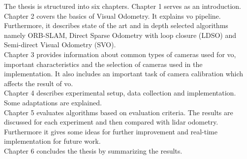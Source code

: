 The thesis is structured into six chapters. Chapter 1 serves as an introduction.\\
\newline 
Chapter 2 covers the basics of Visual Odometry. It explains \acrshort{vo} pipeline. Furthermore, it describes state of the art and in depth selected algorithms namely ORB-SLAM, Direct Sparse Odometry with loop closure (LDSO) and Semi-direct Visual Odometry (SVO).\\  
\newline 
Chapter 3 provides information about common types of cameras used for \acrshort{vo}, important characteristics and the selection of cameras used in the implementation. It also includes an important task of camera calibration which affects the result of \acrshort{vo}.\\
\newline 
Chapter 4 describes experimental setup, data collection and implementation. Some adaptations are explained.\\
\newline
Chapter 5 evaluates algorithms based on evaluation criteria. The results are discussed for each experiment and then compared with \acrshort{lidar} odometry. Furthermore it gives some ideas for further improvement and real-time implementation for future work.\\
\newline
Chapter 6 concludes the thesis by summarizing the results.